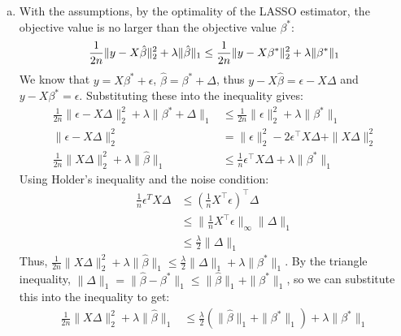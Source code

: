 \documentclass[11pt,a4paper,margin=1in]{article}
\begin{document}
\begin{enumerate}[(a)]
    Substituting this into the inequality gives $\frac{1}{n}\|X\Delta\|_2^2 \leq 3\lambda\sqrt{k}\|\Delta\|_2$.
    We can then apply the $\ell_2$ bound (0.2) to get:
    \begin{align*}
        \frac{1}{n}\|X\Delta\|_2^2 &\leq 3\lambda\sqrt{k}\left(\frac{3\lambda\sqrt{k}}{\kappa}\right) \\
        &= \frac{9k\lambda^2}{\kappa}
    \end{align*}
    Thus, $\frac{1}{n}\|X\Delta\|_2^2 \leq \frac{9k\lambda^2}{\kappa}$.
    \item With the assumptions, by the optimality of the LASSO estimator, the objective 
    value is no larger than the objective value $\beta^*$:
    \[
        \frac{1}{2n}\|y - X\hat{\beta}\|_2^2 + \lambda\|\hat{\beta}\|_1 \leq \frac{1}{2n}\|y - X\beta^*\|_2^2 + \lambda\|\beta^*\|_1 \\
    \]
    We know that $y = X\beta^* + \epsilon$, $\hat{\beta} = \beta^* + \Delta$, thus
    $y - X\hat{\beta} = \epsilon - X\Delta$ and $y - X\beta^* = \epsilon$. Substituting 
    these into the inequality gives:
    \begin{align*}
        \frac{1}{2n}\|\epsilon - X\Delta\|_2^2 + \lambda\|\beta^* + \Delta\|_1 &\leq \frac{1}{2n}\|\epsilon\|_2^2 + \lambda\|\beta^*\|_1 \\
        \|\epsilon - X\Delta\|_2^2 &= \|\epsilon\|_2^2 - 2\epsilon^\top X\Delta + \|X\Delta\|_2^2 \\
        \frac{1}{2n}\|X\Delta\|_2^2 + \lambda\|\hat{\beta}\|_1 &\leq \frac{1}{n}\epsilon^\top X\Delta + \lambda\|\beta^*\|_1
    \end{align*}
    Using Holder's inequality and the noise condition:
    \begin{align*}
        \frac{1}{n}\epsilon^TX\Delta &\leq \left(\frac{1}{n}X^\top\epsilon\right)^\top\Delta \\
        &\leq \|\frac{1}{n}X^\top\epsilon\|_\infty\|\Delta\|_1 \\
        &\leq \frac{\lambda}{2}\|\Delta\|_1
    \end{align*}
    Thus, $\frac{1}{2n}\|X\Delta\|_2^2 + \lambda\|\hat{\beta}\|_1 \leq \frac{\lambda}{2}\|\Delta\|_1 + \lambda\|\beta^*\|_1$.
    By the triangle inequality, $\|\Delta\|_1 = \|\hat{\beta} - \beta^*\|_1 \leq \|\hat{\beta}\|_1 + \|\beta^*\|_1$, 
    so we can substitute this into the inequality to get:
    \begin{align*}
        \frac{1}{2n}\|X\Delta\|_2^2 + \lambda\|\hat{\beta}\|_1 &\leq \frac{\lambda}{2}(\|\hat{\beta}\|_1 + \|\beta^*\|_1) + \lambda\|\beta^*\|_1 \\

\end{align*}
\end{enumerate}
\end{document}
